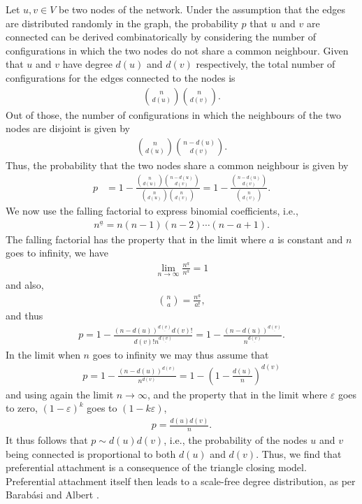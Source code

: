 \documentclass{jimis-final-en}
\begin{document}
Let $u,v \in V$ be two nodes of the network.  Under the assumption that
the edges are distributed randomly in the graph, the probability $p$
that $u$ and $v$ are connected can be derived combinatorically by
considering the number of configurations in which the two nodes do not
share a common neighbour.  Given that $u$ and $v$ have degree $d(u)$ and
$d(v)$ respectively, the total number of configurations for the edges
connected to the nodes is
\begin{align}
  {{n} \choose {d(u)}} {{n} \choose {d(v)}}.
\end{align}
Out of those, the number of configurations in which the neighbours of
the two nodes are disjoint is given by
\begin{align}
  {{n} \choose {d(u)}} {{n - d(u)} \choose {d(v)}}.
\end{align}
Thus, the probability that the two nodes share a common neighbour is
given by 
\begin{align}
  p &= 1 - \frac
  {{{n} \choose {d(u)}} {{n - d(u)} \choose {d(v)}}}
  {{{n} \choose {d(u)}} {{n} \choose {d(v)}}}
  = 1 - \frac
  {{{n - d(u)} \choose {d(v)}}}
  {{{n} \choose {d(v)}}}.
\end{align}
We now use the falling factorial to express binomial coefficients, i.e.,
\begin{align}
  n^{\underline{a}} = n(n-1)(n-2)\cdots(n-a+1). 
\end{align}
The falling factorial has the property that in the limit where $a$ is
constant and $n$ goes to infinity, we have
\begin{align}
  \lim_{n \rightarrow \infty} \frac {n^{\underline{a}}}{n^a} = 1
\end{align}
and also,
\begin{align}
  {n \choose a} = \frac {n^{\underline{a}}} {a!}, 
\end{align}
and thus
\begin{align}
  p = 1 - \frac
  {(n - d(u))^{\underline{d(v)}} d(v)!}
  {d(v)! n^{\underline{d(v)}}} 
  = 1 - \frac
  {(n - d(u))^{\underline{d(v)}}}
  {n^{\underline{d(v)}}}.
\end{align}
In the limit when $n$ goes to infinity we may thus assume that
\begin{align}
  p = 1 - \frac
  { (n - d(u))^{d(v)} }
  { n         ^{d(v)} }
  = 1 - \left( 1 - \frac {d(u)} {n} \right)^{d(v)}
\end{align}
and using again the limit $n \rightarrow \infty$, and the property that
in the limit where $\varepsilon$ goes to zero, $(1-\varepsilon)^k$ goes to
$(1-k\varepsilon)$, 
\begin{align}
  p = \frac {d(u)d(v)} {n}. 
\end{align}
It thus follows that $p \sim d(u)d(v)$, i.e., the probability of the
nodes $u$ and $v$ being connected is proportional to both $d(u)$ and $d(v)$.
Thus, we find that preferential attachment is a consequence of the triangle closing
model. 
Preferential attachment itself then leads to a scale-free degree
distribution, as per Barabási and Albert \citeyearpar{b439}. 
\end{document}
